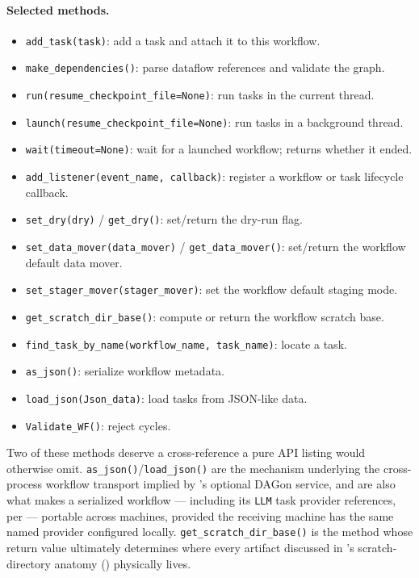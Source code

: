 \paragraph{Selected methods.}
\begin{itemize}[leftmargin=1.4em]
  \item \texttt{add\_task(task)}: add a task and attach it to this workflow.
  \item \texttt{make\_dependencies()}: parse dataflow references and
    validate the graph.
  \item \texttt{run(resume\_checkpoint\_file=None)}: run tasks in the
    current thread.
  \item \texttt{launch(resume\_checkpoint\_file=None)}: run tasks in a
    background thread.
  \item \texttt{wait(timeout=None)}: wait for a launched workflow; returns
    whether it ended.
  \item \texttt{add\_listener(event\_name, callback)}: register a workflow
    or task lifecycle callback.
  \item \texttt{set\_dry(dry)} / \texttt{get\_dry()}: set/return the
    dry-run flag.
  \item \texttt{set\_data\_mover(data\_mover)} / \texttt{get\_data\_mover()}:
    set/return the workflow default data mover.
  \item \texttt{set\_stager\_mover(stager\_mover)}: set the workflow default
    staging mode.
  \item \texttt{get\_scratch\_dir\_base()}: compute or return the workflow
    scratch base.
  \item \texttt{find\_task\_by\_name(workflow\_name, task\_name)}: locate a
    task.
  \item \texttt{as\_json()}: serialize workflow metadata.
  \item \texttt{load\_json(Json\_data)}: load tasks from JSON-like data.
  \item \texttt{Validate\_WF()}: reject cycles.
\end{itemize}

Two of these methods deserve a cross-reference a pure API listing would
otherwise omit. \texttt{as\_json()}/\texttt{load\_json()} are the mechanism
underlying the cross-process workflow transport implied by
's optional DAGon service, and are also what
makes a serialized workflow --- including its \texttt{LLM} task provider
references, per  --- portable across machines, provided
the receiving machine has the same named provider configured locally.
\texttt{get\_scratch\_dir\_base()} is the method whose return value
ultimately determines where every artifact discussed in
's scratch-directory anatomy ()
physically lives.

